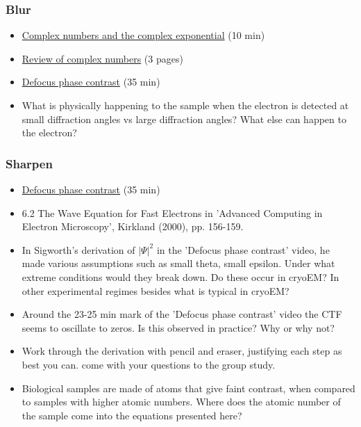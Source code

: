 \documentclass[11pt, oneside]{article}   	%
\begin{document}
\subsubsection{Blur}
\begin{itemize}
\item \href{https://youtu.be/CZkPG95eoS0}{Complex numbers and the complex exponential} (10 min)
\item \href{https://cryoemprinciples.yale.edu/sites/default/files/files/1%20Review%20of%20Complex%20Numbers.pdf}{Review	of complex	numbers} (3 pages)
\item \href{https://youtu.be/m2Hm1ziZFZg}{Defocus phase contrast} (35 min)

\end{itemize}
\begin{itemize}
\item What is physically happening to the sample when the electron is detected at small diffraction angles vs large diffraction angles? What else can happen to the electron?
\end{itemize}

\subsubsection{Sharpen}
\begin{itemize}
	\item \href{https://youtu.be/m2Hm1ziZFZg}{Defocus phase contrast} (35 min)
	\item 6.2 The Wave Equation for Fast Electrons in 'Advanced Computing in Electron Microscopy', Kirkland (2000), pp. 156-159.
\end{itemize}
\begin{itemize}
\item In Sigworth's derivation of $|\Psi|^2$ in the 'Defocus phase contrast' video, he made various assumptions such as small theta, small epsilon. Under what extreme conditions would they break down. Do these occur in cryoEM? In other experimental regimes besides what is typical in cryoEM?
\item Around the 23-25 min mark of the 'Defocus phase contrast' video the CTF seems to oscillate to zeros. Is this observed in practice? Why or why not?
\item Work through the derivation with pencil and eraser, justifying each step as best you can. come with your questions to the group study.
\item Biological samples are made of atoms that give faint contrast, when compared to samples with higher atomic numbers. Where does the atomic number of the sample come into the equations presented here? 
\end{itemize}
\end{document}
